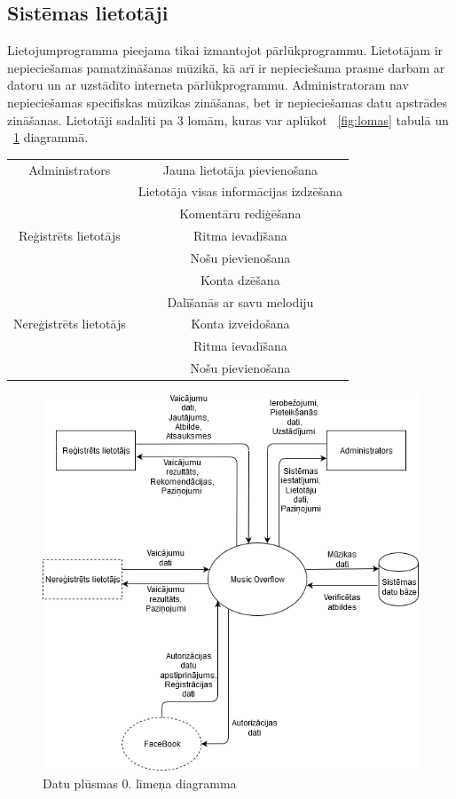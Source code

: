 \documentclass[12pt]{article}
\begin{document}
\subsection{Sistēmas lietotāji}

Lietojumprogramma pieejama tikai izmantojot pārlūkprogrammu. Lietotājam ir nepieciešamas pamatzināšanas mūzikā, kā arī ir nepieciešama prasme darbam ar datoru un ar uzstādīto interneta pārlūkprogrammu. Administratoram nav nepieciešamas specifiskas mūzikas zināšanas, bet ir nepieciešamas datu apstrādes zināšanas. Lietotāji sadalīti pa 3 lomām, kuras var aplūkot ~\ref{fig:lomas} tabulā un ~\ref{fig:dpd_0} diagrammā.\\

\begin{center}
\begin{tabular}{|c|c|}
\hline
Administrators & Jauna lietotāja pievienošana  \\
& Lietotāja visas informācijas izdzēšana \\
& Komentāru rediģēšana \\
\hline
Reģistrēts lietotājs & Ritma ievadīšana \\
& Nošu pievienošana \\
& Konta dzēšana \\
& Dalīšanās ar savu melodiju\\
\hline
Nereģistrēts lietotājs & Konta izveidošana \\
& Ritma ievadīšana \\
& Nošu pievienošana \\
\hline
\end{tabular}
\label{fig:lomas}
\end{center}

\begin{figure}[H]
\begin{center}
		\includegraphics[scale=0.5]{DPD0.png}
		\caption{Datu plūsmas 0. līmeņa diagramma}
		\label{fig:dpd_0}
\end{center}
\end{figure}
\end{document}
